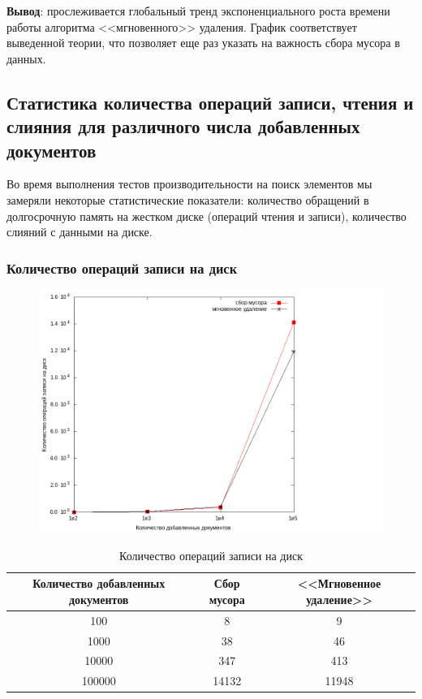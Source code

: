 \textbf{Вывод}: прослеживается глобальный тренд экспоненциального роста времени
работы алгоритма <<мгновенного>> удаления. График соответствует выведенной теории,
что позволяет еще раз указать на важность сбора мусора в данных.

\newpage
\subsection{Статистика количества операций записи, чтения и слияния для различного числа добавленных документов}

Во время выполнения тестов производительности на поиск элементов мы замеряли
некоторые статистические показатели: количество обращений в долгосрочную память
на жестком диске (операций чтения и записи), количество слияний с данными на
диске.
\subsubsection{Количество операций записи на диск}

\begin{figure}[H]
\includegraphics[width=\linewidth]{fig/writecalls.png}
\end{figure}

\begin{table}[H]
      \caption{Количество операций записи на диск}
      \centering
      \small
      \singlespacing
      \begin{tabular}{|c|c|c|}
            \hline
            Количество добавленных документов   & Сбор мусора                 & <<Мгновенное удаление>>     \\ \hline \hline
            100                                 & 8                           & 9                           \\ \hline
            1000                                & 38                          & 46                          \\ \hline
            10000                               & 347                         & 413                         \\ \hline
            100000                              & 14132                       & 11948                       \\ \hline
\end{tabular}
\end{table}

